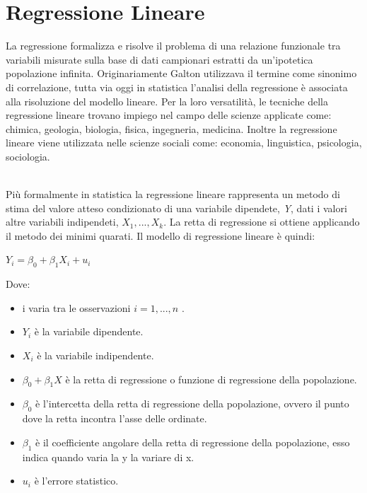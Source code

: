 \documentclass[a4paper,12pt,titlepage,oneside,openany]{book}
\begin{document}
\chapter{Regressione Lineare}
La regressione formalizza e risolve il problema di una relazione funzionale tra variabili misurate sulla base di dati campionari estratti da un'ipotetica popolazione infinita.
Originariamente Galton utilizzava il termine come sinonimo di correlazione, tutta via oggi in statistica l'analisi della regressione è associata alla risoluzione del modello lineare. Per la loro versatilità, le tecniche della regressione lineare trovano impiego nel campo delle scienze applicate come: chimica, geologia, biologia, fisica, ingegneria, medicina. Inoltre la regressione lineare viene utilizzata nelle scienze sociali come: economia, linguistica, psicologia, sociologia.\par
\noindent \\
Più formalmente in statistica la regressione lineare rappresenta un metodo di stima del valore atteso condizionato di una variabile dipendete, {\itshape Y}, dati i valori altre variabili indipendeti, \begin{math} X_{1},...,X_{k} \end{math}.
La retta di regressione si ottiene applicando il metodo dei minimi quarati.
Il modello di regressione lineare è quindi:
\begin{center}
  \begin{math}
    Y_{i}=\beta_{0}+\beta_{1}X_{i}+u_{i}
  \end{math}
\end{center}
\newpage
Dove:
\begin{itemize}
  \item i varia tra le osservazioni \begin{math} i=1,...,n \end{math} .
  \item \begin{math} Y_{i} \end{math} è la variabile dipendente.
  \item \begin{math} X_{i} \end{math}  è la variabile indipendente. 
  \item \begin{math} \beta_{0}+\beta_{1}X \end{math} è la retta di regressione o funzione di regressione della popolazione.
  \item \begin{math} \beta_{0} \end{math} è l'intercetta della retta di regressione della popolazione, ovvero il punto dove la retta incontra l'asse delle ordinate.
  \item \begin{math} \beta_{1} \end{math} è il coefficiente angolare della retta di regressione della popolazione, esso indica quando varia la y la variare di x.
  \item \begin{math} u_{i} \end{math} è l'errore statistico.
\end{itemize}
\end{document}
